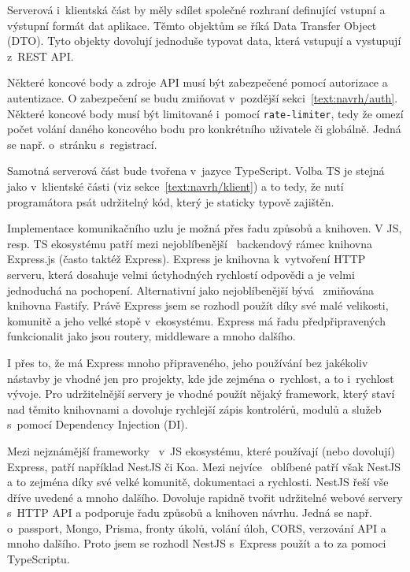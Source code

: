 Serverová i~klientská část by měly sdílet společné rozhraní definující vstupní a výstupní formát dat aplikace.
Těmto objektům se říká Data Transfer Object (DTO).
Tyto objekty dovolují jednoduše typovat data, která vstupují a vystupují z~REST API.

Některé koncové body a zdroje API musí být zabezpečené pomocí autorizace a autentizace. 
O zabezpečení se budu zmiňovat v~pozdější sekci~\ref{text:navrh/auth}.
Některé koncové body musí být limitované i~pomocí \verb|rate-limiter|, tedy že omezí počet volání daného koncového bodu pro konkrétního uživatele či globálně.
Jedná se např. o~stránku s~registrací.

Samotná serverová část bude tvořena v~jazyce TypeScript.
Volba TS je stejná jako v~klientské části (viz sekce~\ref{text:navrh/klient}) a to tedy, že nutí programátora psát udržitelný kód, který je staticky typově zajištěn.

Implementace komunikačního uzlu je možná přes řadu způsobů a knihoven.
V JS, resp. TS ekosystému patří mezi nejoblíbenější~\cite{brown2019web} backendový rámec knihovna Express.js (často taktéž Express).
Express je knihovna k~vytvoření HTTP serveru, která dosahuje velmi úctyhodných rychlostí odpovědi a je velmi jednoduchá na pochopení.
Alternativní jako nejoblíbenější bývá~\cite{poreba_2023} zmiňována knihovna Fastify.
Právě Express jsem se rozhodl použít díky své malé velikosti, komunitě a jeho velké stopě v~ekosystému.
Express má řadu předpřipravených funkcionalit jako jsou routery, middleware a mnoho dalšího.

I přes to, že má Express mnoho připraveného, jeho používání bez jakékoliv nástavby je vhodné jen pro projekty, kde jde zejména o~rychlost, a to i~rychlost vývoje.
Pro udržitelnější servery je vhodné použít nějaký framework, který staví nad těmito knihovnami a dovoluje rychlejší zápis kontrolérů, modulů a služeb s~pomocí Dependency Injection (DI).

Mezi nejznámější frameworky~\cite{uzayr2022frontend, nest} v~JS ekosystému, které používají (nebo dovolují) Express, patří například NestJS či Koa.
Mezi nejvíce~\cite{nest} oblíbené patří však NestJS a to zejména díky své velké komunitě, dokumentaci a rychlosti.
NestJS řeší vše dříve uvedené a mnoho dalšího.
Dovoluje rapidně tvořit udržitelné webové servery s~HTTP API a podporuje řadu způsobů a knihoven návrhu.
Jedná se např. o~passport, Mongo, Prisma, fronty úkolů, volání úloh, CORS, verzování API a mnoho dalšího.
Proto jsem se rozhodl NestJS s~Express použít a to za pomoci TypeScriptu.

